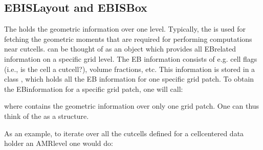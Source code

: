\documentclass[letterpaper,10pt,english]{sphinxmanual}
\begin{document}
\subsection{EBISLayout and EBISBox}
\label{\detokenize{Source/ChomboBasics:ebislayout-and-ebisbox}}
The  holds the geometric information over one  level.
Typically, the  is used for fetching the geometric moments that are required for performing computations near cut\sphinxhyphen{}cells.
 can be thought of as an object which provides all EB\sphinxhyphen{}related information on a specific grid level.
The EB information consists of e.g. cell flags (i.e., is the cell a cut\sphinxhyphen{}cell?), volume fractions, etc.
This information is stored in a class , which holds all the EB information for one specific grid patch.
To obtain the EB\sphinxhyphen{}information for a specific grid patch, one will call:

\begin{sphinxVerbatim}[commandchars=\\\{\},formatcom=\scriptsize]
 
    
      \PYG{p}{[}\PYG{p}{]}
\end{sphinxVerbatim}

where  contains the geometric information over only one grid patch.
One can thus think of the  as a  structure.

As an example, to iterate over all the cut\sphinxhyphen{}cells defined for a cell\sphinxhyphen{}centered data holder an AMR\sphinxhyphen{}level one would do:
\end{document}
